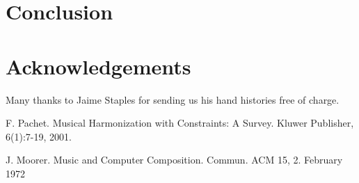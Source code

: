 \documentclass[twoside]{article}
\begin{document}
\begin{multicols}{2}
\section{Conclusion}


\section{Acknowledgements}

Many thanks to Jaime Staples for sending us his hand histories free of charge. 


\begin{thebibliography}{99} %
 F. Pachet. Musical Harmonization with Constraints: A Survey. Kluwer Publisher, 6(1):7-19, 2001.

 J. Moorer. Music and Computer Composition. Commun. ACM 15, 2. February 1972

\end{thebibliography}


\end{multicols}
\end{document}
